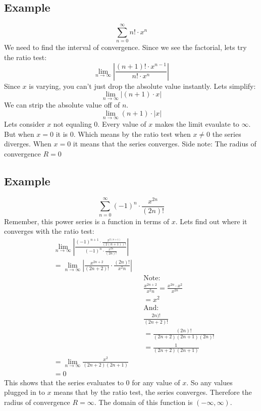 \documentclass{article}
\begin{document}
    \subsection{Example}
        \[\sum_{n=0}^{\infty} n! \cdot x^n \]
        We need to find the interval of convergence.
        Since we see the factorial, lets try the ratio test:
        \[\lim_{n \to \infty} \left| \frac{(n+1)!\cdot x^{n-1}}{n! \cdot x^n}\right|\]
        Since \(x\) is varying, you can't just drop the absolute value instantly.
        Lets simplify:
        \[\lim_{n \to \infty} \left| (n+1) \cdot x\right|\]
        We can strip the absolute value off of \(n\).
        \[\lim_{n \to \infty} (n+1) \cdot |x| \]
        Lets consider \(x\) not equaling 0. 
        Every value of \(x\) makes the limit evaulate to \(\infty\).
        But when \(x = 0\) it is 0.
        Which means by the ratio test when \(x \neq 0\) the series diverges.
        When \(x = 0\) it means that the series converges.
        Side note: The radius of convergence \(R = 0\) 
    
    \subsection{Example}
        \[\sum_{n=0}^{\infty}  (-1)^n \cdot \frac{x^{2n}}{(2n)!}\]
        Remember, this power series is a function in terms of \(x\).
        Lets find out where it converges with the ratio test:
        \begin{align*}
            &\lim_{n \to \infty} \left| \frac{(-1)^{n+1} \cdot \frac{x^{2(n+1)}}{(2(n+1))!}}{(-1)^n \cdot \frac{x^{2n}}{(2n)!}}\right| \\
            &= \lim_{n \to \infty}  \left| \frac{x^{2n+2}}{(2n+2)!} \cdot \frac{(2n)!}{x^2n}\right| \\
            && & \text{Note:} \\
            && & \frac{x^{2n+2}}{x^2n} = \frac{x^{2n} \cdot x^2}{x^{2n}} \\
            && &= x^2 \\
            && & \text{And:} \\
            && & \frac{2n)!}{(2n + 2)!} \\
            && &= \frac{(2n)!}{(2n+2)(2n+1)(2n)!} \\
            && &= \frac{1}{(2n+2)(2n+1)} \\
            &= \lim_{n \to \infty} \frac{x^2}{(2n+2)(2n+1)} \\
            &= 0
        \end{align*}
        This shows that the series evaluates to 0 for any value of \(x\).
        So any values plugged in to \(x\) means that by the ratio test, the series converges.
        Therefore the radius of convergence \(R = \infty\).
        The domain of this function is \((-\infty, \infty)\).
        
\end{document}
